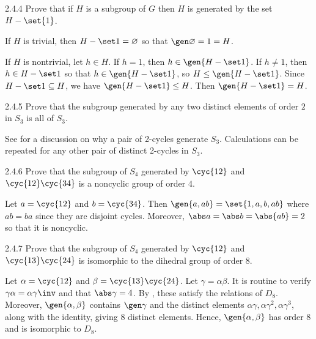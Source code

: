 \begin{exercise}{2.4.4}
    Prove that if $H$ is a subgroup of $G$ then $H$ is generated by the set $H - \set{1}$.
\end{exercise}

\begin{sol}
    If $H$ is trivial, then $H - \set 1 = \varnothing$ so that $\gen\varnothing = 1 = H$.

    If $H$ is nontrivial, let $h \in H$.
	If $h = 1$, then $h \in \gen{H - \set 1}$.
	If $h \neq 1$, then $h \in H - \set 1$ so that $h \in \gen{H - \set 1}$, so $H \leq \gen{H - \set 1}$.
	Since $H - \set 1 \subseteq H$, we have $\gen{H - \set 1} \leq H$.
	Then $\gen{H - \set 1} = H$.
\end{sol}

\begin{exercise}{2.4.5}
    Prove that the subgroup generated by any two distinct elements of order $2$ in $S_3$ is all of $S_3$.
\end{exercise}

\begin{sol}
    See  for a discussion on why a pair of 2-cycles generate $S_3$.
	Calculations can be repeated for any other pair of distinct 2-cycles in $S_3$.
\end{sol}

\begin{exercise}{2.4.6}
    Prove that the subgroup of $S_4$ generated by $\cyc{1 2}$ and $\cyc{1 2}\cyc{3 4}$ is a noncyclic group of order $4$.
\end{exercise}

\begin{sol}
    Let $a = \cyc{1 2}$ and $b = \cyc{3 4}$.
	Then $\gen{a, ab} = \set{1, a, b, ab}$ where $ab = ba$ since they are disjoint cycles.
	Moreover, $\abs a = \abs b = \abs{ab} = 2$ so that it is noncyclic.
\end{sol}

\begin{exercise}{2.4.7}
    Prove that the subgroup of $S_4$ generated by $\cyc{1 2}$ and $\cyc{1 3}\cyc{2 4}$ is isomorphic to the dihedral group of order $8$.
\end{exercise}

\begin{sol}
    Let $\alpha = \cyc{1 2}$ and $\beta = \cyc{1 3}\cyc{2 4}$.
	Let $\gamma = \alpha\beta$.
	It is routine to verify $\gamma\alpha = \alpha\gamma\inv$ and that $\abs\gamma = 4$.
	By , these satisfy the relations of $D_8$.
	Moreover, $\gen{\alpha, \beta}$ contains $\gen\gamma$ and the distinct elements $\alpha\gamma, \alpha\gamma^2, \alpha\gamma^3$, along with the identity, giving 8 distinct elements.
	Hence, $\gen{\alpha, \beta}$ has order 8 and is isomorphic to $D_8$.
\end{sol}

